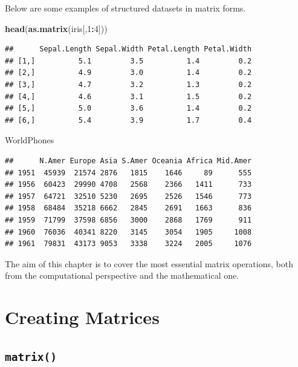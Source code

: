 \documentclass[10pt,b5paper,krantz1]{krantz}
\newenvironment{Shaded}{\begin{snugshade}}{\end{snugshade}}
\newcommand{\DecValTok}[1]{\textcolor[rgb]{0.06,0.06,0.06}{#1}}
\newcommand{\KeywordTok}[1]{\textcolor[rgb]{0.27,0.27,0.27}{\textbf{#1}}}
\newcommand{\NormalTok}[1]{#1}
\newcommand{\OperatorTok}[1]{\textcolor[rgb]{0.43,0.43,0.43}{\textbf{#1}}}
\begin{document}
Below are some examples of structured datasets in matrix forms.

\begin{Shaded}
\begin{Highlighting}[]
\KeywordTok{head}\NormalTok{(}\KeywordTok{as.matrix}\NormalTok{(iris[,}\DecValTok{1}\OperatorTok{:}\DecValTok{4}\NormalTok{]))}
\end{Highlighting}
\end{Shaded}

\begin{verbatim}
##      Sepal.Length Sepal.Width Petal.Length Petal.Width
## [1,]          5.1         3.5          1.4         0.2
## [2,]          4.9         3.0          1.4         0.2
## [3,]          4.7         3.2          1.3         0.2
## [4,]          4.6         3.1          1.5         0.2
## [5,]          5.0         3.6          1.4         0.2
## [6,]          5.4         3.9          1.7         0.4
\end{verbatim}

\begin{Shaded}
\begin{Highlighting}[]
\NormalTok{WorldPhones}
\end{Highlighting}
\end{Shaded}

\begin{verbatim}
##      N.Amer Europe Asia S.Amer Oceania Africa Mid.Amer
## 1951  45939  21574 2876   1815    1646     89      555
## 1956  60423  29990 4708   2568    2366   1411      733
## 1957  64721  32510 5230   2695    2526   1546      773
## 1958  68484  35218 6662   2845    2691   1663      836
## 1959  71799  37598 6856   3000    2868   1769      911
## 1960  76036  40341 8220   3145    3054   1905     1008
## 1961  79831  43173 9053   3338    3224   2005     1076
\end{verbatim}

The aim of this chapter is to cover the most essential matrix operations,
both from the computational perspective and the mathematical one.

\hypertarget{creating-matrices}{%
\section{Creating Matrices}\label{creating-matrices}}

\hypertarget{matrix}{%
\subsection{\texorpdfstring{\texttt{matrix()}}{matrix()}}\label{matrix}}
\end{document}
